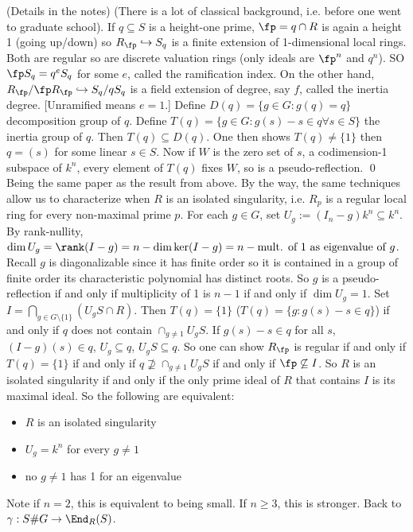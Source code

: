 \pfsk (Details in the notes) (There is a lot of classical background, i.e. before one went to graduate school). If $q \subseteq S$ is a height-one prime, $\fp=q \cap R$ is again a height 1 (going up/down) so $R_\fp \hookrightarrow S_q$ is a finite extension of 1-dimensional local rings. Both are regular so are discrete valuation rings (only ideals are $\fp^n$ and $q^n$). SO $\fp S_q= q^e S_q$ for some $e$, called the ramification index. On the other hand, $R_\fp/\fp R_\fp \hookrightarrow S_q/ qS_q$ is a field extension of degree, say $f$, called the inertia degree. [Unramified means $e=1$.] Define $D(q)=\{ g \in G \colon g(q)=q \}$ decomposition group of $q$. Define $T(q)= \{ g \in G \colon g(s)-s \in q \forall s \in S\}$ the inertia group of $q$. Then $T(q) \subseteq D(q)$. One then shows $T(q) \neq \{1\}$ then $q=(s)$ for some linear $s \in S$. Now if $W$ is the zero set of $s$, a codimension-1 subspace of $k^n$, every element of $T(q)$ fixes $W$, so is a pseudo-reflection. \qed \\


Being the same paper as the result from above. By the way, the same techniques allow us to characterize when $R$ is an isolated singularity, i.e. $R_p$ is a regular local ring for every non-maximal prime $p$. For each $g \in G$, set $U_g:= (I_n-g)k^n \subseteq k^n$. By rank-nullity, $\dim U_g= \rank(I-g)= n - \dim \ker(I-g)= n- \text{mult. of 1 as eigenvalue of }g$.  Recall $g$ is diagonalizable since it has finite order so it is contained in a group of finite order its characteristic polynomial has distinct roots. So $g$ is a pseudo-reflection if and only if multiplicity of 1 is $n-1$ if and only if $\dim U_g = 1$. Set $I= \bigcap_{g \in G \setminus\{1\}} (U_gS \cap R)$. Then $T(q)= \{1\}$ ($T(q)= \{ g \colon g(s)-s \in q\}$) if and only if $q$ does not contain $\cap_{g \neq 1} U_gS$. If $g(s)-s \in q$ for all $s$, $(I-g)(s) \in q$, $U_g \subseteq q$, $U_gS \subseteq q$. So one can show $R_\fp$ is regular if and only if $T(q)=\{1\}$ if and only if $q \not\supseteq \cap_{g \neq 1} U_gS$ if and only if $\fp \not\subseteq I$. So $R$ is an isolated singularity if and only if the only prime ideal of $R$ that contains $I$ is its maximal ideal. So the following are equivalent:
	\begin{itemize}
	\item $R$ is an isolated singularity
	\item $U_g= k^n$ for every $g \neq 1$
	\item no $g \neq 1$ has 1 for an eigenvalue
	\end{itemize}
Note if $n= 2$, this is equivalent to being small. If $n \geq 3$, this is stronger. Back to $\gamma: S\#G \to \End_R(S)$. 


